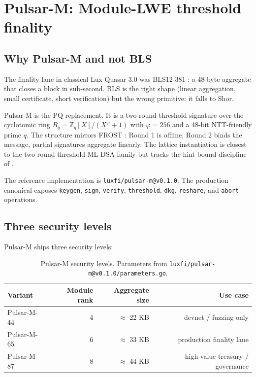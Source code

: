 \section{Pulsar-M: Module-LWE threshold finality}
\label{sec:pulsar-m}

\subsection{Why Pulsar-M and not BLS}

The finality lane in classical Lux Quasar 3.0 \cite{lp020} was BLS12-381
\cite{bls}: a 48-byte aggregate that closes a block in sub-second. BLS is the
right shape (linear aggregation, small certificate, short verification) but
the wrong primitive: it falls to Shor.

Pulsar-M is the PQ replacement. It is a two-round threshold signature over
the cyclotomic ring $R_q = \mathbb{Z}_q[X]/(X^\varphi+1)$ with $\varphi=256$
and a 48-bit NTT-friendly prime $q$. The structure mirrors FROST
\cite{frost}: Round 1 is offline, Round 2 binds the message, partial
signatures aggregate linearly. The lattice instantiation is closest to the
two-round threshold ML-DSA family \cite{tmldsa2025,dttf2024} but tracks the
hint-bound discipline of \cite{boschini2024corona}.

The reference implementation is \texttt{luxfi/pulsar-m@v0.1.0}. The
production canonical exposes \texttt{keygen}, \texttt{sign}, \texttt{verify},
\texttt{threshold}, \texttt{dkg}, \texttt{reshare}, and \texttt{abort}
operations.

\subsection{Three security levels}

Pulsar-M ships three security levels:

\begin{table}[H]
\centering
\caption{Pulsar-M security levels. Parameters from
\texttt{luxfi/pulsar-m@v0.1.0/parameters.go}.}
\label{tab:pulsar-m-levels}
\begin{tabular}{lrrr}
\toprule
Variant & Module rank & Aggregate size & Use case \\
\midrule
Pulsar-M-44 & 4         & $\approx$ 22 KB & devnet / fuzzing only \\
Pulsar-M-65 & 6         & $\approx$ 33 KB & production finality lane \\
Pulsar-M-87 & 8         & $\approx$ 44 KB & high-value treasury / governance \\
\bottomrule
\end{tabular}
\end{table}

